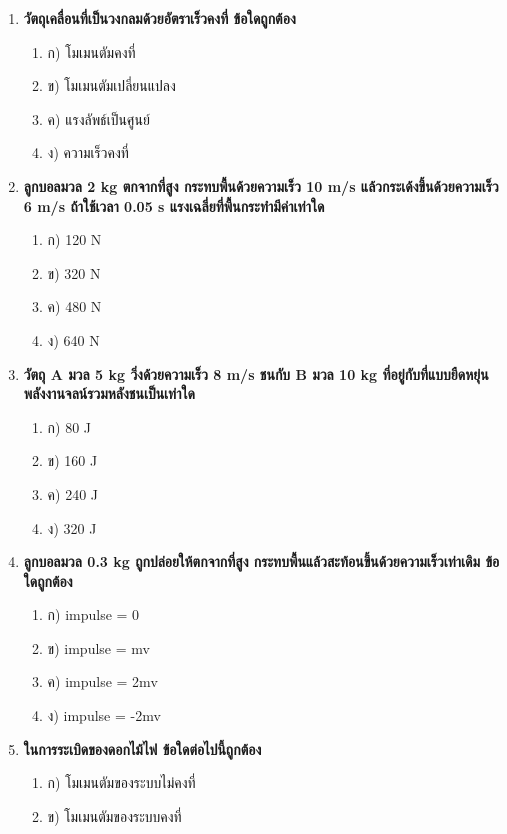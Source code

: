 \documentclass[12pt]{article}
\begin{document}
\begin{enumerate}
\begin{enumerate}
\item ข) ทั้งสองก้อนเคลื่อนที่ด้วย v/2
\item ค) ก้อนที่วิ่งสะท้อนกลับด้วย v
\item ง) ทั้งสองก้อนหยุดนิ่ง
\end{enumerate}
\item \textbf{วัตถุเคลื่อนที่เป็นวงกลมด้วยอัตราเร็วคงที่ ข้อใดถูกต้อง}
\begin{enumerate}
\item ก) โมเมนตัมคงที่
\item ข) โมเมนตัมเปลี่ยนแปลง
\item ค) แรงลัพธ์เป็นศูนย์
\item ง) ความเร็วคงที่
\end{enumerate}
\item \textbf{ลูกบอลมวล 2 kg ตกจากที่สูง กระทบพื้นด้วยความเร็ว 10 m/s แล้วกระเด้งขึ้นด้วยความเร็ว 6 m/s ถ้าใช้เวลา 0.05 s แรงเฉลี่ยที่พื้นกระทำมีค่าเท่าใด}
\begin{enumerate}
\item ก) 120 N
\item ข) 320 N
\item ค) 480 N
\item ง) 640 N
\end{enumerate}
\item \textbf{วัตถุ A มวล 5 kg วิ่งด้วยความเร็ว 8 m/s ชนกับ B มวล 10 kg ที่อยู่กับที่แบบยืดหยุ่น พลังงานจลน์รวมหลังชนเป็นเท่าใด}
\begin{enumerate}
\item ก) 80 J
\item ข) 160 J
\item ค) 240 J
\item ง) 320 J
\end{enumerate}
\item \textbf{ลูกบอลมวล 0.3 kg ถูกปล่อยให้ตกจากที่สูง กระทบพื้นแล้วสะท้อนขึ้นด้วยความเร็วเท่าเดิม ข้อใดถูกต้อง}
\begin{enumerate}
\item ก) impulse = 0
\item ข) impulse = mv
\item ค) impulse = 2mv
\item ง) impulse = -2mv
\end{enumerate}
\item \textbf{ในการระเบิดของดอกไม้ไฟ ข้อใดต่อไปนี้ถูกต้อง}
\begin{enumerate}
\item ก) โมเมนตัมของระบบไม่คงที่
\item ข) โมเมนตัมของระบบคงที่

\end{enumerate}
\end{enumerate}
\end{document}
